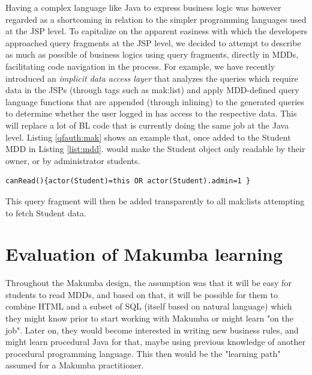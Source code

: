 \documentclass{llncs}
\begin{document}


Having a complex language like Java to express business logic was however regarded as a shortcoming in relation to the simpler programming languages used at the JSP level. To capitalize on the apparent easiness with which the developers approached query fragments at the JSP level, we decided to attempt to describe as much as possible of business logics using query fragments, directly in MDDs, facilitating code navigation in the process. For example, we have recently introduced an \textit{implicit data access layer} that analyzes the queries which require data in the JSPs (through tags such as mak:list) and apply MDD-defined query language functions that are appended (through inlining)  to the generated queries to determine whether the user logged in has access to the respective data. This will replace a lot of  BL code that is currently doing the same job at the Java level. Listing \ref{qfauth:mak} shows an example that, once added to the Student MDD in Listing \ref{list:mdd}. would make the Student object only readable by their owner, or by administrator students.
\lstset{basicstyle=\small, captionpos=b, caption= query fragment authorization rule, label=qfauth:mak, frame=shadowbox}
\begin{lstlisting}
canRead(){actor(Student)=this OR actor(Student).admin=1 }
\end{lstlisting}
This query fragment will then be added transparently to all mak:lists attempting to fetch Student data.

\section{Evaluation of Makumba learning}\label{sec:techCommittee}
Throughout the Makumba design, the assumption was that it will be easy for students to read MDDs, and based on that, it will be possible for them to combine HTML and a subset of SQL (itself based on natural language) which they might know prior to start working with Makumba or might learn "on the job". Later on, they would become interested in writing new business rules, and might learn procedural Java for that, maybe using previous knowledge of another procedural programming language. This then would be the "learning path" assumed for a Makumba practitioner.
\end{document}
